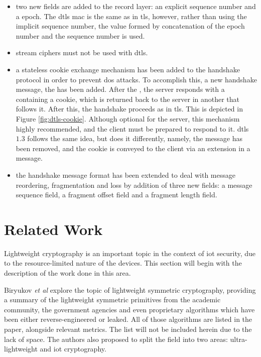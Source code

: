 \documentclass{llncs}
\begin{document}
\begin{itemize}
  \item two new fields are added to the record layer: an explicit  sequence
  number and a  epoch. The \gls{dtls} \gls{mac} is the same as in \gls{tls},
  however, rather than using the implicit sequence number, the  value
  formed by concatenation of the epoch number and the sequence number is used.

  \item stream ciphers must not be used with \gls{dtls}.

  \item a stateless cookie exchange mechanism has been added to the handshake protocol
  in order to prevent \gls{dos} attacks. To accomplish this, a new handshake
  message, the  has been added. After
  the , the server responds with a 
  containing a cookie, which is returned back to the server in another
   that follows it. After this, the handshake proceeds as in \gls{tls}. This is depicted in Figure \ref{fig:dtls-cookie}.   Although optional for the server, this mechanism highly recommended, and the
  client must be prepared to respond to it. \gls{dtls} $1.3$ follows the same idea, but does it differently, namely,
  the  message has been removed, and the cookie is conveyed to the client via an extension in a  message.

  \item the handshake message format has been extended to deal with message reordering,
  fragmentation and loss by addition of three new fields: a message sequence field,
  a fragment offset field and a fragment length field.
\end{itemize}

\section{Related Work}

Lightweight cryptography is an important topic in the context of \gls{iot} security, due to the resource-limited nature of the devices. This section will begin with the description of the work done in this area.

Biryukov \textit{et al}\cite{Stateoft96:online} explore the topic of lightweight symmetric cryptography,
providing a summary of the lightweight symmetric
primitives from the academic community, the government agencies and even proprietary
algorithms which have been either reverse-engineered or leaked. All of those algorithms
are listed in the paper, alongside relevant metrics. The list will not be
included herein due to the lack of space. The authors also proposed
to split the field into two areas: ultra-lightweight and \gls{iot} cryptography.
\end{document}
